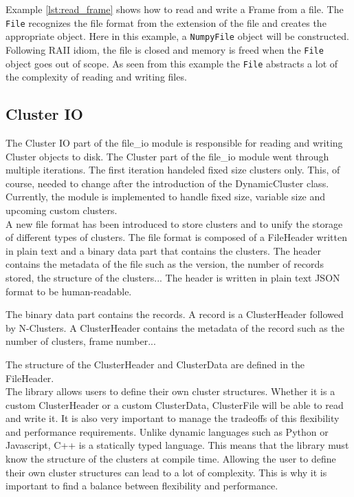 \documentclass[./chapitre3.tex]{subfiles}
\begin{document}
Example \ref{lst:read_frame} shows how to read and write a Frame from a file. The \lstinline|File|
recognizes the file format from the extension of the file and creates the appropriate object.
Here in this example, a \lstinline|NumpyFile| object will be constructed.
Following RAII idiom, the file is closed and memory is freed when the \lstinline|File|
object goes out of scope. As seen from this example the \lstinline|File| abstracts a lot
of the complexity of reading and writing files.\\

\subsection{Cluster IO}
The Cluster IO part of the file\_io module is responsible for reading and writing Cluster objects to disk.
The Cluster part of the file\_io module went through multiple iterations. The first iteration
handeled fixed size clusters only. This, of course, needed to change after the introduction
of the DynamicCluster class. Currently, the module is implemented to handle fixed size,
variable size and upcoming custom clusters.\\

A new file format has been introduced to store clusters and to unify the storage of different
types of clusters. The file format is composed of a FileHeader written in plain text and a binary
data part that contains the clusters. The header contains the metadata of the file such as
the version, the number of records stored, the structure of the clusters... The header is
written in plain text JSON format to be human-readable.

The binary data part contains the
records. A record is a ClusterHeader followed by N-Clusters. A ClusterHeader contains the
metadata of the record such as the number of clusters, frame number...

The structure of the ClusterHeader and ClusterData are defined in the FileHeader.\\

The library allows users to define their own cluster structures. Whether it is
a custom ClusterHeader or a custom ClusterData, ClusterFile will be able to read and write
it. It is also very important to manage the tradeoffs of this flexibility and performance
requirements. Unlike dynamic languages such as Python or Javascript, C++ is a statically typed
language. This means that the library must know the structure of the clusters at compile time.
Allowing the user to define their own cluster structures can lead to a lot of complexity.
This is why it is important to find a balance between flexibility and performance.\\
\end{document}
